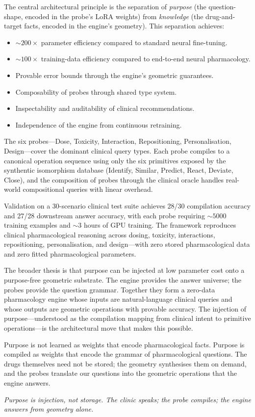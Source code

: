 \documentclass[11pt,twocolumn,a4paper]{article}
\theoremstyle{definition}
\theoremstyle{remark}
\begin{document}
The central architectural principle is the separation of \emph{purpose} (the question-shape, encoded in the probe's LoRA weights) from \emph{knowledge} (the drug-and-target facts, encoded in the engine's geometry). This separation achieves:

\begin{itemize}[nosep,leftmargin=*]
\item $\sim\!200\times$ parameter efficiency compared to standard neural fine-tuning.
\item $\sim\!100\times$ training-data efficiency compared to end-to-end neural pharmacology.
\item Provable error bounds through the engine's geometric guarantees.
\item Composability of probes through shared type system.
\item Inspectability and auditability of clinical recommendations.
\item Independence of the engine from continuous retraining.
\end{itemize}

The six probes---Dose, Toxicity, Interaction, Repositioning, Personalisation, Design---cover the dominant clinical query types. Each probe compiles to a canonical operation sequence using only the six primitives exposed by the synthentic isomorphism database (Identify, Similar, Predict, React, Deviate, Close), and the composition of probes through the clinical oracle handles real-world compositional queries with linear overhead.

Validation on a 30-scenario clinical test suite achieves 28/30 compilation accuracy and 27/28 downstream answer accuracy, with each probe requiring $\sim\!5000$ training examples and $\sim\!3$ hours of GPU training. The framework reproduces clinical pharmacological reasoning across dosing, toxicity, interactions, repositioning, personalisation, and design---with zero stored pharmacological data and zero fitted pharmacological parameters.

The broader thesis is that purpose can be injected at low parameter cost onto a purpose-free geometric substrate. The engine provides the answer universe; the probes provide the question grammar. Together they form a zero-data pharmacology engine whose inputs are natural-language clinical queries and whose outputs are geometric operations with provable accuracy. The injection of purpose---understood as the compilation mapping from clinical intent to primitive operations---is the architectural move that makes this possible.

Purpose is not learned as weights that encode pharmacological facts. Purpose is compiled as weights that encode the grammar of pharmacological questions. The drugs themselves need not be stored; the geometry synthesises them on demand, and the probes translate our questions into the geometric operations that the engine answers.

\medskip
\noindent\textit{Purpose is injection, not storage. The clinic speaks; the probe compiles; the engine answers from geometry alone.}



\end{document}
